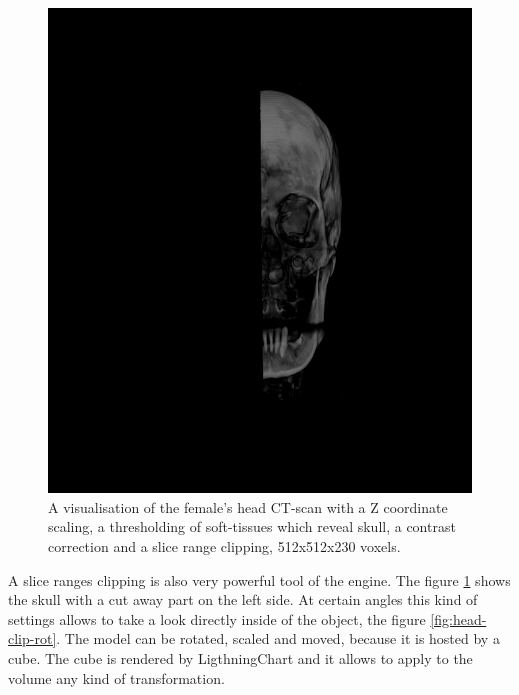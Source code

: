 \documentclass[twoside, english, 11pt]{report}
\begin{document}
\begin{figure}[H]
\centerline{\includegraphics[scale = 0.45]{img/head-clip}}
\caption{A visualisation of the female's head CT-scan with a Z coordinate scaling, a thresholding of soft-tissues which reveal skull, a contrast correction and a slice range clipping, 512x512x230 voxels.\label{fig:head-clip}}
\end{figure}

A slice ranges clipping is also very powerful tool of the engine. The figure \ref{fig:head-clip} shows the skull with a cut away part on the left side. At certain angles this kind of settings allows to take a look directly inside of the object, the figure \ref{fig:head-clip-rot}. The model can be rotated, scaled and moved, because it is hosted by a cube. The cube is rendered by LigthningChart and it allows to apply to the volume any kind of transformation.\\
\end{document}
